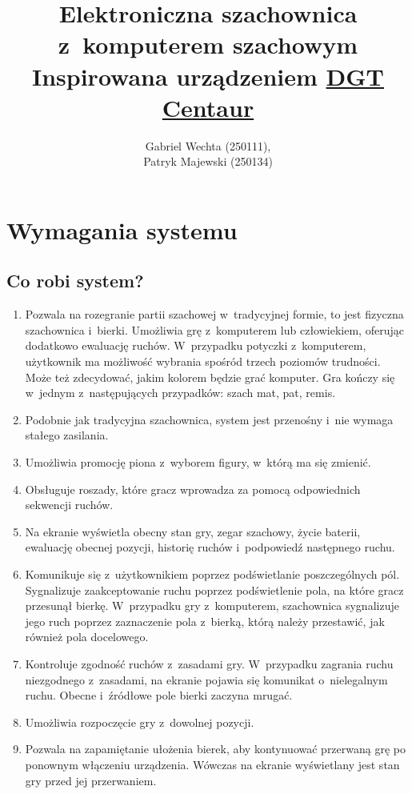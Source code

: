 \documentclass[12pt]{article}
\title{%
Elektroniczna szachownica z komputerem szachowym \\
\large Inspirowana urządzeniem \href{https://www.dgt.nl/index.php/products/chess-computers/dgt-centaur}{DGT Centaur}
}
\author{Gabriel Wechta (250111),\\ Patryk Majewski (250134) }
\date{}
\begin{document}
\maketitle

\section{Wymagania systemu}
\subsection{Co robi system?}
\begin{enumerate}
    \item Pozwala na rozegranie partii szachowej w tradycyjnej formie, to jest fizyczna szachownica i bierki. Umożliwia grę z komputerem lub człowiekiem, oferując dodatkowo ewaluację ruchów. W przypadku potyczki z komputerem, użytkownik ma możliwość wybrania spośród trzech poziomów trudności. Może też zdecydować, jakim kolorem będzie grać komputer. Gra kończy się w jednym z następujących przypadków: szach mat, pat, remis.
    \item Podobnie jak tradycyjna szachownica, system jest przenośny i nie wymaga stałego zasilania.
    \item Umożliwia promocję piona z wyborem figury, w którą ma się zmienić.
    \item Obsługuje roszady, które gracz wprowadza za pomocą odpowiednich sekwencji ruchów.
    \item Na ekranie wyświetla obecny stan gry, zegar szachowy, życie baterii, ewaluację obecnej pozycji, historię ruchów i podpowiedź następnego ruchu.
    \item Komunikuje się z użytkownikiem poprzez podświetlanie poszczególnych pól. Sygnalizuje zaakceptowanie ruchu poprzez podświetlenie pola, na które gracz przesunął bierkę. W przypadku gry z komputerem, szachownica sygnalizuje jego ruch poprzez zaznaczenie pola z bierką, którą należy przestawić, jak również pola docelowego.
    \item Kontroluje zgodność ruchów z zasadami gry. W przypadku zagrania ruchu niezgodnego z zasadami, na ekranie pojawia się komunikat o nielegalnym ruchu. Obecne i źródłowe pole bierki zaczyna mrugać.
    \item Umożliwia rozpoczęcie gry z dowolnej pozycji. 
    \item Pozwala na zapamiętanie ułożenia bierek, aby kontynuować przerwaną grę po ponownym włączeniu urządzenia. Wówczas na ekranie wyświetlany jest stan gry przed jej przerwaniem.

\end{enumerate}
\end{document}
